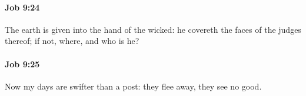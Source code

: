 		\paragraph{Job 9:24} %
			\label{JOB-9-24}

			The earth is given into the hand of the wicked: he covereth the faces of the judges thereof; if not, where, and who is he?


		\paragraph{Job 9:25} %
			\label{JOB-9-25}

			Now my days are swifter than a post: they flee away, they see no good.


